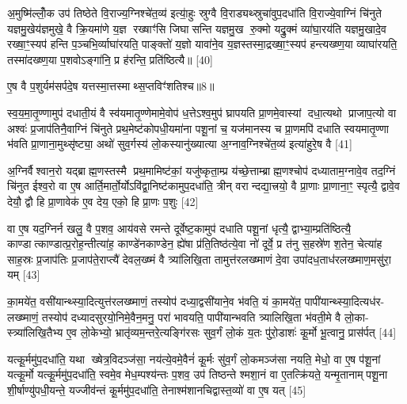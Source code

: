 अ॒मुष्मि॑ल्लोँ॒क उप॑ तिष्ठेते वि॒राज्य॒ग्निश्चे॑त॒व्य॑ इत्या॒॑हुः स्रुग्वै वि॒राड्यथ्स्रुचा॑वुप॒दधा॑ति वि॒राज्ये॒वाग्निं चि॑नुते यज्ञमु॒खेय॑ज्ञमुखे॒ वै क्रि॒यमा॑णे य॒ज्ञ रख्षाꣳ॑सि जिघासन्ति यज्ञमु॒ख रु॒क्मो यद्रु॒क्मं व्या॑घा॒रय॑ति यज्ञमु॒खादे॒व रख्षा॒ꣳ॒स्यप॑ हन्ति प॒ञ्चभि॒र्व्याघा॑रयति॒ पाङ्क्तो॑ य॒ज्ञो यावा॑ने॒व य॒ज्ञस्तस्मा॒द्रख्षा॒ꣳ॒स्यप॑ हन्त्यख्ष्ण॒या व्याघा॑रयति॒ तस्मा॑दख्ष्ण॒या प॒शवोऽङ्गा॑नि॒ प्र ह॑रन्ति॒ प्रति॑ष्ठित्यै॥ [40]

{\scriptsize {ए॒ष वै प॒शुर्यम॑सर्पदे॒ष यत्तस्मा॒त्तस्माथ्स॒प्तविꣳ॑शतिश्च॥8॥}}

स्व॒य॒मा॒तृ॒ण्णामुप॑ दधाती॒यं वै स्व॑यमातृ॒ण्णेमामे॒वोप॑ ध॒त्तेऽश्व॒मुप॑ घ्रापयति प्रा॒णमे॒वास्यां दधा॒त्यथो प्राजाप॒त्यो वा अश्वः॑ प्र॒जाप॑तिनै॒वाग्निं चि॑नुते प्रथ॒मेष्ट॑कोपधी॒यमा॑ना पशू॒नां च॒ यज॑मानस्य च प्रा॒णमपि॑ दधाति स्वयमातृ॒ण्णा भ॑वति प्रा॒णाना॒मुथ्सृ॑ष्ट्या॒ अथो॑ सुव॒र्गस्य॑ लो॒कस्यानु॑ख्यात्या अ॒ग्नाव॒ग्निश्चे॑त॒व्य॑ इत्या॑हुरे॒ष वै [41]

अ॒ग्निर्वैश्वान॒रो यद्ब्राह्म॒णस्तस्मै प्रथ॒मामिष्ट॑कां॒ यजु॑ष्कृता॒म्प्र य॑च्छे॒त्ताम्ब्राह्म॒णश्चोप॑ दध्याताम॒ग्नावे॒व तद॒ग्निं चि॑नुत ईश्व॒रो वा ए॒ष आर्ति॒मार्तो॒र्योऽवि॑द्वा॒निष्ट॑कामुप॒दधा॑ति॒ त्रीन् वरान्दद्या॒त्त्रयो॒ वै प्रा॒णाः प्रा॒णाना॒ꣳ॒ स्पृत्यै॒ द्वावे॒व देयौ॒ द्वौ हि प्रा॒णावेक॑ ए॒व देय॒ एको॒ हि प्रा॒णः प॒शुः [42]

वा ए॒ष यद॒ग्निर्न खलु॒ वै प॒शव॒ आय॑वसे रमन्ते दूर्वेष्ट॒कामुप॑ दधाति पशू॒नां धृत्यै॒ द्वाभ्या॒म्प्रति॑ष्ठित्यै॒ काण्डात्काण्डात्प्र॒रोह॒न्तीत्या॑ह॒ काण्डे॑नकाण्डेन॒ ह्ये॑षा प्र॑ति॒तिष्ठ॑त्ये॒वा नो॑ दूर्वे॒ प्र त॑नु स॒हस्रे॑ण श॒तेन॒ चेत्या॑ह साह॒स्रः प्र॒जाप॑तिः प्र॒जाप॑ते॒राप्त्यै॑ देवल॒ख्ष्मं वै त्र्या॑लिखि॒ता तामुत्त॑रलख्ष्माणं दे॒वा उपा॑दध॒ताध॑रलख्ष्माण॒मसु॑रा॒ यम् [43]

का॒मये॑त॒ वसी॑यान्थ्स्या॒दित्युत्त॑रलख्ष्माणं॒ तस्योप॑ दध्या॒द्वसी॑याने॒व भ॑वति॒ यं का॒मये॑त॒ पापी॑यान्थ्स्या॒दित्यध॑र- लख्ष्माणं॒ तस्योप॑ दध्यादसुरयो॒निमे॒वैन॒मनु॒ परा॑ भावयति॒ पापी॑यान्भवति त्र्यालिखि॒ता भ॑वती॒मे वै लो॒का- स्त्र्या॑लिखि॒तैभ्य ए॒व लो॒केभ्यो॒ भ्रातृ॑व्यम॒न्तरे॒त्यङ्गि॑रसः सुव॒र्गं लो॒कं य॒तः पु॑रो॒डाशः॑ कू॒र्मो भू॒त्वानु॒ प्रास॑र्पत् [44]

यत्कू॒र्ममु॑प॒दधा॑ति॒ यथा ख्षेत्र॒विदञ्ज॑सा॒ नय॑त्ये॒वमे॒वैनं॑ कू॒र्मः सु॑व॒र्गं लो॒कमञ्ज॑सा नयति॒ मेधो॒ वा ए॒ष प॑शू॒नां यत्कू॒र्मो यत्कू॒र्ममु॑प॒दधा॑ति॒ स्वमे॒व मेध॒म्पश्य॑न्तः प॒शव॒ उप॑ तिष्ठन्ते श्मशा॒नं वा ए॒तत्क्रि॑यते॒ यन्मृ॒तानाम्पशू॒ना शी॒र्\mbox{}षाण्यु॑पधी॒यन्ते॒ यज्जीव॑न्तं कू॒र्ममु॑प॒दधा॑ति॒ तेनाश्म॑शानचिद्वास्त॒व्यो॑ वा ए॒ष यत् [45]

